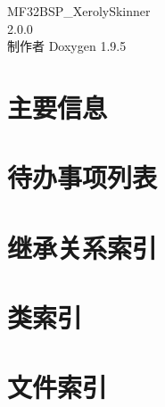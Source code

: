 \documentclass[twoside]{book}
\newcommand{\+}{\discretionary{\mbox{\scriptsize$\hookleftarrow$}}{}{}}
\newcommand{\clearemptydoublepage}{%
    \newpage{\pagestyle{empty}\cleardoublepage}%
  }
\begin{document}
  \raggedbottom
  \begin{CJK}{UTF8}{gbsn}
    \hypersetup{pageanchor=false,
                bookmarksnumbered=true,
                pdfencoding=unicode
               }
  \begin{titlepage}
  \vspace*{7cm}
  \begin{center}%
  {\Large MF32\+BSP\+\_\+\+Xeroly\+Skinner}\\
  [1ex]\large 2.\+0.\+0 \\
  \vspace*{1cm}
  {\large 制作者 Doxygen 1.9.5}\\
  \end{center}
  \end{titlepage}
  \clearemptydoublepage
  \tableofcontents
  \clearemptydoublepage
  \hypersetup{pageanchor=true}
\chapter{主要信息}
\label{index}\hypertarget{index}{}
\chapter{待办事项列表}
\label{todo}

\chapter{继承关系索引}

\chapter{类索引}

\chapter{文件索引}


\end{CJK}
\end{document}
